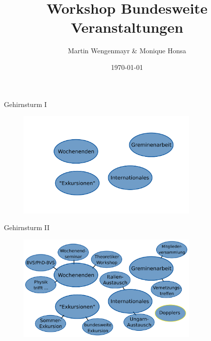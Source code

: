 \documentclass[
]{beamer}
\title[Bundesweites]{Workshop Bundesweite Veranstaltungen}
\author[Martin \& Monique]{Martin Wengenmayr \& Monique Honsa}
\date{\today}
\institute[]{A-Team Promotion}
\begin{document}
\maketitle

\begin{frame}{}
 \tableofcontents
\end{frame}

\begin{frame}{Gehirnsturm I}
  \begin{figure}
   \centering
   \includegraphics[width=0.80\textwidth]{figure/brainstormBundesweit_empty}
  \end{figure}
  \end{frame}

\begin{frame}{Gehirnsturm II}
\begin{figure}
 \centering
 \includegraphics[width=0.80\textwidth]{figure/brainstormBundesweit_full}
\end{figure}
\end{frame}
\end{document}
